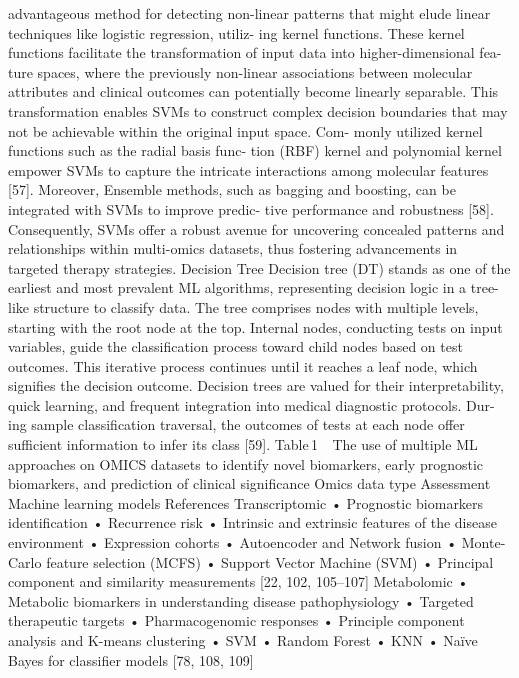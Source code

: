 advantageous method for detecting non-linear patterns that
might elude linear techniques like logistic regression, utiliz-
ing kernel functions. These kernel functions facilitate the
transformation of input data into higher-dimensional fea-
ture spaces, where the previously non-linear associations
between molecular attributes and clinical outcomes can
potentially become linearly separable. This transformation
enables SVMs to construct complex decision boundaries that
may not be achievable within the original input space. Com-
monly utilized kernel functions such as the radial basis func-
tion (RBF) kernel and polynomial kernel empower SVMs to
capture the intricate interactions among molecular features
[57]. Moreover, Ensemble methods, such as bagging and
boosting, can be integrated with SVMs to improve predic-
tive performance and robustness [58]. Consequently, SVMs
offer a robust avenue for uncovering concealed patterns and
relationships within multi-omics datasets, thus fostering
advancements in targeted therapy strategies.
Decision Tree
Decision tree (DT) stands as one of the earliest and most
prevalent ML algorithms, representing decision logic in a
tree-like structure to classify data. The tree comprises nodes
with multiple levels, starting with the root node at the top.
Internal nodes, conducting tests on input variables, guide
the classification process toward child nodes based on test
outcomes. This iterative process continues until it reaches
a leaf node, which signifies the decision outcome. Decision
trees are valued for their interpretability, quick learning, and
frequent integration into medical diagnostic protocols. Dur-
ing sample classification traversal, the outcomes of tests at
each node offer sufficient information to infer its class [59].
Table 1   The use of multiple ML approaches on OMICS datasets to identify novel biomarkers, early prognostic biomarkers, and prediction of
clinical significance
Omics data type
Assessment
Machine learning models
References
Transcriptomic
• Prognostic biomarkers identification
• Recurrence risk
• Intrinsic and extrinsic features of the disease environment
• Expression cohorts
• Autoencoder and Network
fusion
• Monte-Carlo feature
selection (MCFS)
• Support Vector Machine
(SVM)
• Principal component and
similarity measurements
[22, 102, 105–107]
Metabolomic
• Metabolic biomarkers in understanding disease pathophysiology
• Targeted therapeutic targets
• Pharmacogenomic responses
• Principle component
analysis and K-means
clustering
• SVM
• Random Forest
• KNN
• Naïve Bayes for classifier
models
[78, 108, 109]
